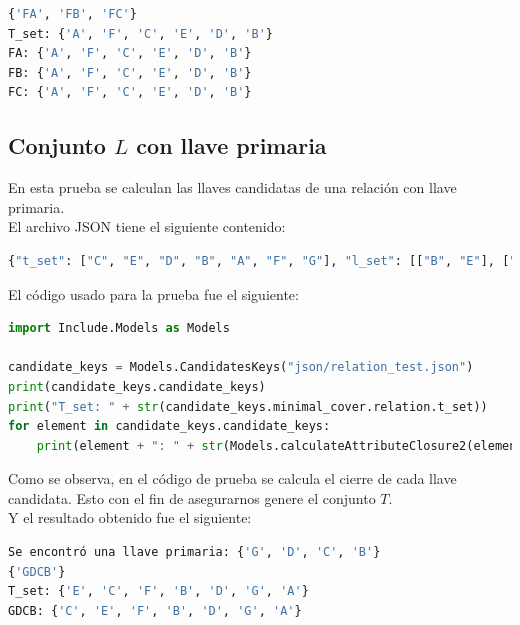 \documentclass[a4paper,12pt]{article}
\begin{document}
{\begin{lstlisting}[language=bash, caption={Resultado de llaves candidatas.\\\hspace{\textwidth}}, captionpos=t]
{'FA', 'FB', 'FC'}
T_set: {'A', 'F', 'C', 'E', 'D', 'B'}
FA: {'A', 'F', 'C', 'E', 'D', 'B'}
FB: {'A', 'F', 'C', 'E', 'D', 'B'}
FC: {'A', 'F', 'C', 'E', 'D', 'B'}
\end{lstlisting}

\subsection{Conjunto $L$ con llave primaria}
En esta prueba se calculan las llaves candidatas de una relación con llave primaria.
\\
El archivo JSON tiene el siguiente contenido:

\begin{lstlisting}[language=python, caption={Archivo JSON con llave primaria.\\\hspace{\textwidth}}, captionpos=t]
{"t_set": ["C", "E", "D", "B", "A", "F", "G"], "l_set": [["B", "E"], ["D", "E"], ["G", "F"], ["A", "E"], ["G", "E"], ["B", "F"], ["F", "A"]]}
\end{lstlisting}

El código usado para la prueba fue el siguiente:

\begin{lstlisting}[language=python, caption={Prueba con una relación con llave primaria.\\\hspace{\textwidth}}, captionpos=t]
import Include.Models as Models

candidate_keys = Models.CandidatesKeys("json/relation_test.json")
print(candidate_keys.candidate_keys)
print("T_set: " + str(candidate_keys.minimal_cover.relation.t_set))
for element in candidate_keys.candidate_keys:
    print(element + ": " + str(Models.calculateAttributeClosure2(element,candidate_keys.minimal_cover.irreducible_rel.l_set)))

\end{lstlisting}
Como se observa, en el código de prueba se calcula el cierre de cada llave candidata. Esto con el fin de asegurarnos genere el conjunto $T$.
\\
Y el resultado obtenido fue el siguiente:

\begin{lstlisting}[language=bash, caption={Resultado de llaves candidatas.\\\hspace{\textwidth}}, captionpos=t]
Se encontró una llave primaria: {'G', 'D', 'C', 'B'}
{'GDCB'}
T_set: {'E', 'C', 'F', 'B', 'D', 'G', 'A'}
GDCB: {'C', 'E', 'F', 'B', 'D', 'G', 'A'}
\end{lstlisting}


}
\end{document}
